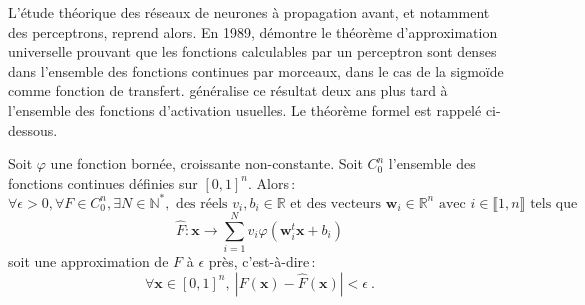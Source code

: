 L'étude théorique des réseaux de neurones à propagation avant, et notamment des perceptrons, reprend alors. En 1989, \citet{cybenko_approximation_1989} démontre le théorème d'approximation universelle prouvant que les fonctions calculables par un perceptron sont denses dans l'ensemble des fonctions continues par morceaux, dans le cas de la sigmoïde comme fonction de transfert. \citet{hornik_approximation_1991} généralise ce résultat deux ans plus tard à l'ensemble des fonctions d'activation usuelles. Le théorème formel est rappelé ci-dessous.

\begin{theorem}
Soit $\varphi$ une fonction bornée, croissante non-constante. Soit $C_0^n$ l'ensemble des fonctions continues définies sur $[0,1]^n$. Alors\,:
$$\forall \epsilon > 0, \forall F \in C_0^n, \exists N \in \mathbb{N}^{*}, \text{ des réels } v_i, b_i \in \mathbb{R} \text{ et des vecteurs } \mathbf{w}_i \in \mathbb{R}^n \text{ avec } i \in \llbracket 1, n\rrbracket \text{ tels que}$$
$$\hat{F} : \mathbf{x} \rightarrow \sum_{i=1}^N v_i \varphi\left(\mathbf{w}_i^t \mathbf{x} + b_i \right)$$
soit une approximation de $F$ à $\epsilon$ près, c'est-à-dire\,:
$$\forall \mathbf{x} \in [0,1]^n, ~\left| F(\mathbf{x}) - \hat{F}(\mathbf{x}) \right| < \epsilon~.$$
\end{theorem}

